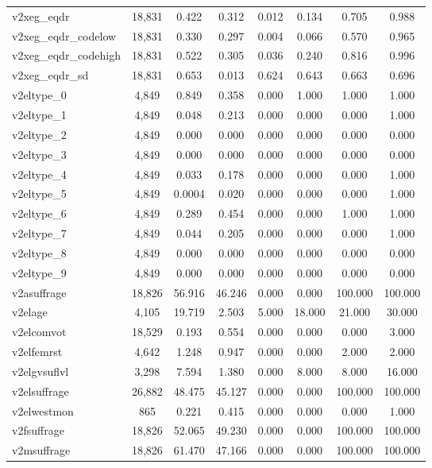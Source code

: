 \begin{table}[!htbp]
\begin{tabular}{@{\extracolsep{5pt}}lccccccc}
v2xeg\_eqdr & 18,831 & 0.422 & 0.312 & 0.012 & 0.134 & 0.705 & 0.988 \\ 
v2xeg\_eqdr\_codelow & 18,831 & 0.330 & 0.297 & 0.004 & 0.066 & 0.570 & 0.965 \\ 
v2xeg\_eqdr\_codehigh & 18,831 & 0.522 & 0.305 & 0.036 & 0.240 & 0.816 & 0.996 \\ 
v2xeg\_eqdr\_sd & 18,831 & 0.653 & 0.013 & 0.624 & 0.643 & 0.663 & 0.696 \\ 
v2eltype\_0 & 4,849 & 0.849 & 0.358 & 0.000 & 1.000 & 1.000 & 1.000 \\ 
v2eltype\_1 & 4,849 & 0.048 & 0.213 & 0.000 & 0.000 & 0.000 & 1.000 \\ 
v2eltype\_2 & 4,849 & 0.000 & 0.000 & 0.000 & 0.000 & 0.000 & 0.000 \\ 
v2eltype\_3 & 4,849 & 0.000 & 0.000 & 0.000 & 0.000 & 0.000 & 0.000 \\ 
v2eltype\_4 & 4,849 & 0.033 & 0.178 & 0.000 & 0.000 & 0.000 & 1.000 \\ 
v2eltype\_5 & 4,849 & 0.0004 & 0.020 & 0.000 & 0.000 & 0.000 & 1.000 \\ 
v2eltype\_6 & 4,849 & 0.289 & 0.454 & 0.000 & 0.000 & 1.000 & 1.000 \\ 
v2eltype\_7 & 4,849 & 0.044 & 0.205 & 0.000 & 0.000 & 0.000 & 1.000 \\ 
v2eltype\_8 & 4,849 & 0.000 & 0.000 & 0.000 & 0.000 & 0.000 & 0.000 \\ 
v2eltype\_9 & 4,849 & 0.000 & 0.000 & 0.000 & 0.000 & 0.000 & 0.000 \\ 
v2asuffrage & 18,826 & 56.916 & 46.246 & 0.000 & 0.000 & 100.000 & 100.000 \\ 
v2elage & 4,105 & 19.719 & 2.503 & 5.000 & 18.000 & 21.000 & 30.000 \\ 
v2elcomvot & 18,529 & 0.193 & 0.554 & 0.000 & 0.000 & 0.000 & 3.000 \\ 
v2elfemrst & 4,642 & 1.248 & 0.947 & 0.000 & 0.000 & 2.000 & 2.000 \\ 
v2elgvsuflvl & 3,298 & 7.594 & 1.380 & 0.000 & 8.000 & 8.000 & 16.000 \\ 
v2elsuffrage & 26,882 & 48.475 & 45.127 & 0.000 & 0.000 & 100.000 & 100.000 \\ 
v2elwestmon & 865 & 0.221 & 0.415 & 0.000 & 0.000 & 0.000 & 1.000 \\ 
v2fsuffrage & 18,826 & 52.065 & 49.230 & 0.000 & 0.000 & 100.000 & 100.000 \\ 
v2msuffrage & 18,826 & 61.470 & 47.166 & 0.000 & 0.000 & 100.000 & 100.000 \\ 

\end{tabular}
\end{table}
